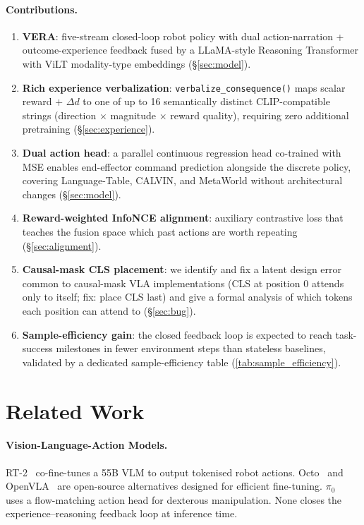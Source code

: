 \documentclass{article}
\newcommand{\modelname}{\textsc{VERA}\xspace}
\begin{document}
\paragraph{Contributions.}
\begin{enumerate}[leftmargin=1.5em,itemsep=2pt]
\item \textbf{\modelname}: five-stream closed-loop robot policy with dual
  action-narration + outcome-experience feedback fused by a LLaMA-style
  Reasoning Transformer with ViLT modality-type embeddings (\S\ref{sec:model}).
\item \textbf{Rich experience verbalization}: \texttt{verbalize\_consequence()}
  maps scalar reward $+$ $\Delta d$ to one of up to 16 semantically distinct
  CLIP-compatible strings (direction $\times$ magnitude $\times$ reward quality),
  requiring zero additional pretraining (\S\ref{sec:experience}).
\item \textbf{Dual action head}: a parallel continuous regression head
  co-trained with MSE enables end-effector command prediction alongside the
  discrete policy, covering Language-Table, CALVIN, and MetaWorld without
  architectural changes (\S\ref{sec:model}).
\item \textbf{Reward-weighted InfoNCE alignment}: auxiliary contrastive loss
  that teaches the fusion space which past actions are worth repeating
  (\S\ref{sec:alignment}).
\item \textbf{Causal-mask CLS placement}: we identify and fix a latent
  design error common to causal-mask VLA implementations (CLS at position
  0 attends only to itself; fix: place CLS last) and give a formal
  analysis of which tokens each position can attend to (\S\ref{sec:bug}).
\item \textbf{Sample-efficiency gain}: the closed feedback loop is
  expected to reach task-success milestones in fewer environment steps
  than stateless baselines, validated by a dedicated sample-efficiency
  table (\cref{tab:sample_efficiency}).
\end{enumerate}

\section{Related Work}
\label{sec:related}

\paragraph{Vision-Language-Action Models.}
RT-2~\citep{brohan2023rt2} co-fine-tunes a 55B VLM to output tokenised
robot actions.
Octo~\citep{octo2024} and OpenVLA~\citep{kim2024openvla} are open-source
alternatives designed for efficient fine-tuning.
$\pi_0$~\citep{black2024pi0} uses a flow-matching action head for
dexterous manipulation.
None closes the experience--reasoning feedback loop at inference time.
\end{document}
